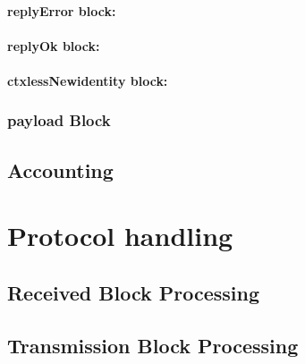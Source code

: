 
\paragraph{replyError block:}


\paragraph{replyOk block:}


\paragraph{ctxlessNewidentity block:}


\subsubsection{payload Block}

\subsection{Accounting}

\section{Protocol handling}

\subsection{Received Block Processing}

\subsection{Transmission Block Processing}
